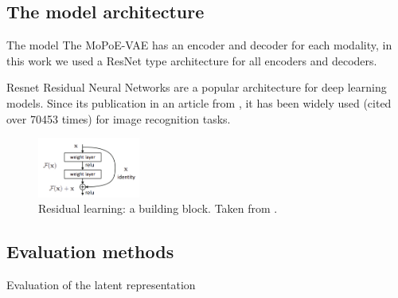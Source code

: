     \subsection{The model architecture}
    \begin{frame}{The model}
        The MoPoE-VAE has an encoder and decoder for each modality, in this work we used a ResNet type architecture for all encoders and decoders.
    \end{frame}

    \begin{frame}{Resnet}
        Residual Neural Networks are a popular architecture for deep learning models.
        Since its publication in an article from \cite{he2016deep}, it has been widely used (cited over 70453 times) for image recognition tasks.
        \begin{figure}
            \includegraphics[width=0.3\textwidth, keepaspectratio]{slides/Residual_block}
            \caption{Residual learning: a building block. Taken from \cite{he2016deep}.}
        \end{figure}

    \end{frame}

    \subsection{Evaluation methods}
    \begin{frame}{Evaluation of the latent representation}
        \begin{figure}[!h]
            \centering
        \end{figure}
    \end{frame}

